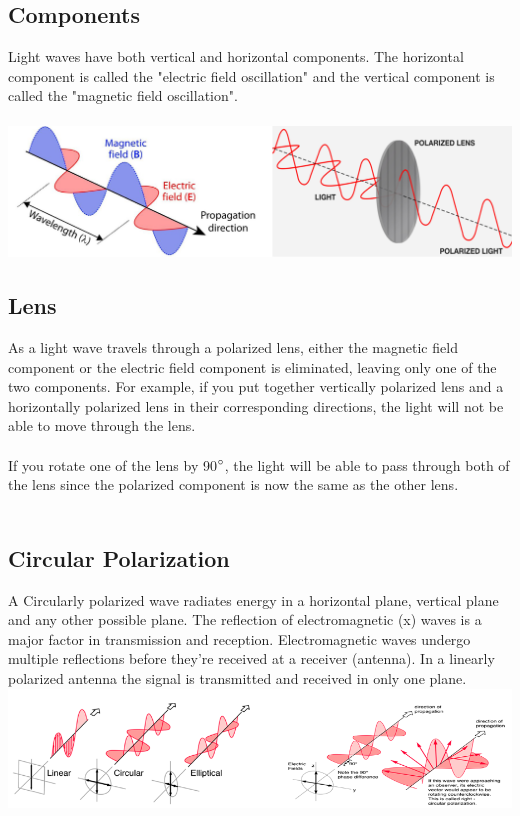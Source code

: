 \documentclass{article}
\begin{document}
\subsection{Components}
Light waves have both vertical and horizontal components. The horizontal component is called the "electric field oscillation" and the vertical component is called the "magnetic field oscillation".\\\\
\includegraphics[scale=0.45]{images/polarization} \\

\subsection{Lens}
\noindent As a light wave travels through a polarized lens, either the magnetic field component or the electric field component is eliminated, leaving only one of the two components. 
For example, if you put together vertically polarized lens and a horizontally polarized lens in their corresponding directions, the light will not be able to move through the lens.
\\\\If you rotate one of the lens by 90$\degree$, the light will be able to pass through both of the lens since the polarized component is now the same as the other lens.\\\\

\subsection{Circular Polarization}
A Circularly polarized wave radiates energy in a horizontal plane, vertical plane and any other possible plane. The reflection of electromagnetic (x) waves is a major factor in transmission and reception. Electromagnetic waves undergo multiple reflections before they're received at a receiver (antenna). In a linearly polarized antenna the signal is transmitted and received in only one plane.
\includegraphics[scale=0.5]{images/circular_polarization} \\
\end{document}
